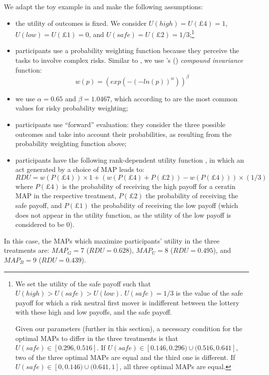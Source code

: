 We adapt the toy example in \cite{Li2020a} and make the following assumptions:
\begin{itemize}
\item the utility of outcomes is fixed. We consider $U(high) = U(\pounds4) = 1$, $U(low) = U(\pounds1) = 0$, and $U(safe) = U(\pounds2) = 1/3$;\footnote{
We set the utility of the safe payoff such that $U(high) > U(safe) > U(low)$.
$U(safe) = 1/3$ is the value of the safe payoff for which a risk neutral first mover is indifferent between the lottery with these high and low payoffs, and the safe payoff.

Given our parameters (further in this section), a necessary condition for the optimal MAPs to differ in the three treatments is that $U(safe) \in [0.296, 0.516]$.
If $U(safe) \in [0.146, 0.296) \cup (0.516, 0.641]$, two of the three optimal MAPs are equal and the third one is different.
If $U(safe) \in [0, 0.146) \cup (0.641, 1]$, all three optimal MAPs are equal.
}
\item participants use a probability weighting function because they perceive the tasks to involve complex risks. Similar to \cite{Li2020a}, we use \citeauthor{Prelec1998}'s (\citeyear{Prelec1998}) \textit{compound invariance} function:
$$w(p) = (exp(-(-ln(p))^\alpha))^\beta$$ 
\item we use $\alpha = 0.65$ and $\beta = 1.0467$, which according to \cite{Li2020a} are the most common values for risky probability weighting;
\item participants use ``forward'' evaluation: they consider the three possible outcomes and take into account their probabilities, as resulting from the probability weighting function above;
\item participants have the following rank-dependent utility function \citep{Schmeidler1989}, in which an act generated by a choice of MAP leads to:
$$RDU = w(P(\pounds4)) \times 1 + (w(P(\pounds4) + P(\pounds2)) - w(P(\pounds4))) \times (1/3)$$
where $P(\pounds4)$ is the probability of receiving the high payoff for a ceratin MAP in the respective treatment, $P(\pounds2)$ the probability of receiving the safe payoff, and $P(\pounds1)$ the probability of receiving the low payoff (which does not appear in the utility function, as the utility of the low payoff is considered to be 0).
\end{itemize}

In this case, the MAPs which maximize participants' utility in the three treatments are: $MAP_G = 7$ ($RDU = 0.628$), $MAP_U = 8$ ($RDU = 0.495$), and $MAP_B = 9$ ($RDU = 0.439$).


